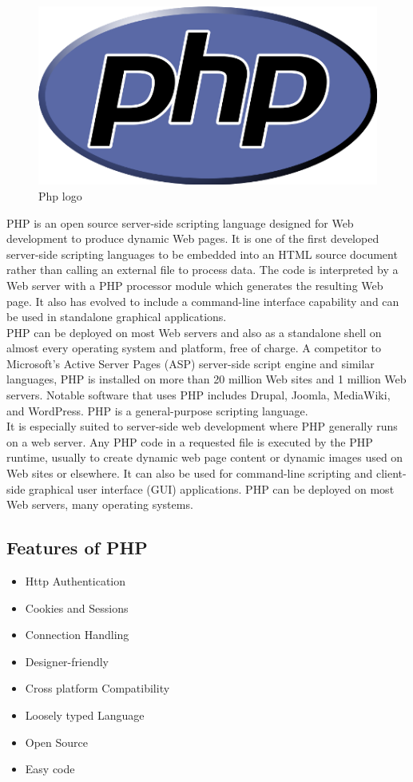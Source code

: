 \begin{figure}[h]
\centering \includegraphics[scale=0.4]{images/php.png}
\caption{Php logo}
\end{figure}
\noindent PHP is an open source server-side scripting language designed for Web development to produce dynamic Web pages. It is one of the first developed server-side scripting languages to be embedded into an HTML source document rather than calling an external file to process data. The code is interpreted by a Web server with a PHP processor module which generates the resulting Web page. It also has evolved to include a command-line interface capability and can be used in standalone graphical applications.\\

\noindent PHP can be deployed on most Web servers and also as a standalone shell on almost every operating system and platform, free of charge. A competitor to Microsoft’s Active Server Pages (ASP) server-side script engine and similar languages, PHP is installed on more than 20 million Web sites and 1 million Web servers. Notable software that uses PHP includes Drupal, Joomla, MediaWiki, and WordPress. PHP is a general-purpose scripting language.\\

\noindent It is especially suited to server-side web development where PHP generally runs on a web server. Any PHP code in a requested file is executed by the PHP runtime, usually to create dynamic web page content or dynamic images used on Web sites or elsewhere. It can also be used for command-line scripting and client-side graphical user interface (GUI) applications. PHP can be deployed on most Web servers, many operating systems.
\subsection{Features of PHP}
\begin{itemize}
\item Http Authentication
\item Cookies and Sessions
\item Connection Handling
\item Designer-friendly 
\item Cross platform Compatibility 
\item Loosely typed Language
\item Open Source
\item Easy code
\end{itemize}



